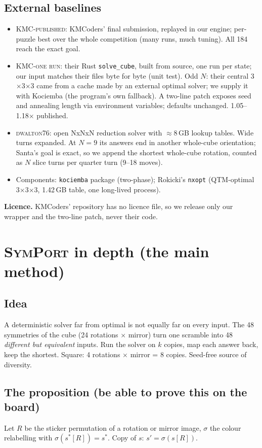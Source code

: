 \documentclass[10.5pt,a4paper]{article}
\newcommand{\Cu}[1]{#1$\times$#1$\times$#1}
\newcommand{\M}[1]{\textsc{#1}}
\begin{document}
\subsection{External baselines}
\begin{itemize}
\item \M{KMC-published}: KMCoders' final submission, replayed in our engine; per-puzzle best over the whole competition (many runs,
much tuning). All 184 reach the exact goal.
\item \M{KMC-one run}: their Rust \texttt{solve\_cube}, built from source, one run per state; our input matches their files byte
for byte (unit test). Odd $N$: their central \Cu{3} came from a cache made by an external optimal solver; we supply it with
Kociemba (the program's own fallback). A two-line patch exposes seed and annealing length via environment variables; defaults
unchanged. 1.05--1.18$\times$ published.
\item \M{dwalton76}: open NxNxN reduction solver with $\approx$8\,GB lookup tables. Wide turns expanded. At $N=9$ its answers end
in another whole-cube orientation; Santa's goal is exact, so we append the shortest whole-cube rotation, counted as $N$ slice turns
per quarter turn (9--18 moves).
\item Components: \texttt{kociemba} package (two-phase); Rokicki's \texttt{nxopt} (QTM-optimal \Cu{3}, 1.42\,GB table, one
long-lived process).
\end{itemize}
\textbf{Licence.} KMCoders' repository has no licence file, so we release only our wrapper and the two-line patch, never their code.

\section{\M{SymPort} in depth (the main method)}

\subsection{Idea}
A deterministic solver far from optimal is not equally far on every input. The 48 symmetries of the cube (24 rotations $\times$
mirror) turn one scramble into 48 \emph{different but equivalent} inputs. Run the solver on $k$ copies, map each answer back, keep
the shortest. Square: 4 rotations $\times$ mirror = 8 copies. Seed-free source of diversity.

\subsection{The proposition (be able to prove this on the board)}
Let $R$ be the sticker permutation of a rotation or mirror image, $\sigma$ the colour relabelling with
$\sigma(s^\ast[R])=s^\ast$. Copy of $s$: $s'=\sigma(s[R])$.
\end{document}
